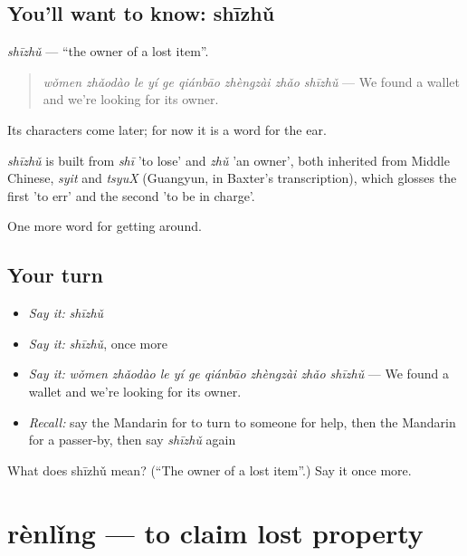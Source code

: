 \subsection*{You'll want to know: shīzhǔ}
\emph{shīzhǔ} — \textquotedblleft{}the owner of a lost item\textquotedblright{}.

\begin{quote}
\emph{wǒmen zhǎodào le yí ge qiánbāo zhèngzài zhǎo shīzhǔ} — We found a wallet and we're looking for its owner.
\end{quote}

Its characters come later; for now it is a word for the ear.

\begin{cousinweb}
\emph{shīzhǔ} is built from \emph{shī} 'to lose' and \emph{zhǔ} 'an owner', both inherited from Middle Chinese, \emph{syit} and \emph{tsyuX} (Guangyun, in Baxter's transcription), which glosses the first 'to err' and the second 'to be in charge'.
\end{cousinweb}

\begin{grammarlens}[title={What you've built}]
One more word for getting around.
\end{grammarlens}

\subsection*{Your turn}
\begin{itemize}
\raggedright
  \item \emph{Say it:} \emph{shīzhǔ}
  \item \emph{Say it:} \emph{shīzhǔ}, once more
  \item \emph{Say it:} \emph{wǒmen zhǎodào le yí ge qiánbāo zhèngzài zhǎo shīzhǔ} — We found a wallet and we're looking for its owner.
  \item \emph{Recall:} say the Mandarin for to turn to someone for help, then the Mandarin for a passer-by, then say \emph{shīzhǔ} again
\end{itemize}

\begin{tcolorbox}[breakable,colback=teal!4,colframe=teal!35!black,title={Before you move on}]
What does shīzhǔ mean? (\textquotedblleft{}The owner of a lost item\textquotedblright{}.) Say it once more.
\end{tcolorbox}
\section[rènlǐng]{rènlǐng — to claim lost property}

